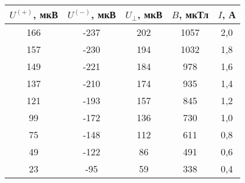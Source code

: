 \begin{table}[h!]
    \begin{center}
        \begin{tabular}{|c|c|c|c|c|}
            \hline
            $U^{(+)}$, мкВ & $U^{(-)}$, мкВ & $U_{\bot}$, мкВ & $B$, мкТл & $I$, А \\ \hline
            166            & -237           & 202             & 1057      & 2,0    \\ \hline
            157            & -230           & 194             & 1032      & 1,8    \\ \hline
            149            & -221           & 184             & 978       & 1,6    \\ \hline
            137            & -210           & 174             & 935       & 1,4    \\ \hline
            121            & -193           & 157             & 845       & 1,2    \\ \hline
            99             & -172           & 136             & 730       & 1,0    \\ \hline
            75             & -148           & 112             & 611       & 0,8    \\ \hline
            49             & -122           & 86              & 491       & 0,6    \\ \hline
            23             & -95            & 59              & 338       & 0,4    \\ \hline
        \end{tabular}
    \end{center}
    \caption{}
\end{table}